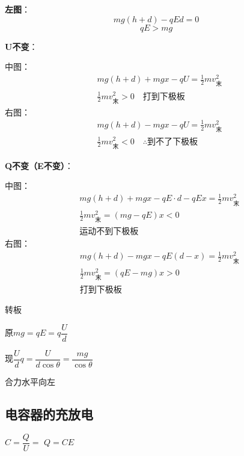 \textbf{左图}：
\[
mg(h+d)-qEd=0
\]
\[
qE>mg
\]

\textbf{U不变}：

中图：
\begin{align*}
&mg(h+d)+mgx-qU=\tfrac{1}{2}mv_{\text{末}}^2\\
&\tfrac{1}{2}mv_{\text{末}}^2>0\quad\text{打到下极板}
\end{align*}
右图：
\begin{align*}
&mg(h+d)-mgx-qU=\tfrac{1}{2}mv_{\text{末}}^2\\
&\tfrac{1}{2}mv_{\text{末}}^2<0\quad\therefore\text{到不了下极板}
\end{align*}

\textbf{Q不变（E不变）}：

中图：
\begin{align*}
&mg(h+d)+mgx-qE\cdot d-qEx=\tfrac{1}{2}mv_{\text{末}}^2\\
&\tfrac{1}{2}mv_{\text{末}}^2=(mg-qE)x<0\\
&\text{运动不到下极板}
\end{align*}
右图：
\begin{align*}
&mg(h+d)-mgx-qE(d-x)=\tfrac{1}{2}mv_{\text{末}}^2\\
&\tfrac{1}{2}mv_{\text{末}}^2=(qE-mg)x>0\\
&\text{打到下极板}
\end{align*}

\begin{problem}[4]
转板
\begin{solution}
原\quad $mg=qE=q\dfrac{U}{d}$

现\quad $\dfrac{U}{d}q=\dfrac{U}{d\cos\theta}=\dfrac{mg}{\cos\theta}$ %

合力水平向左
\end{solution}
\end{problem}

\subsection{电容器的充放电}

$C=\dfrac{Q}{U}=$ \qquad $Q=CE$

